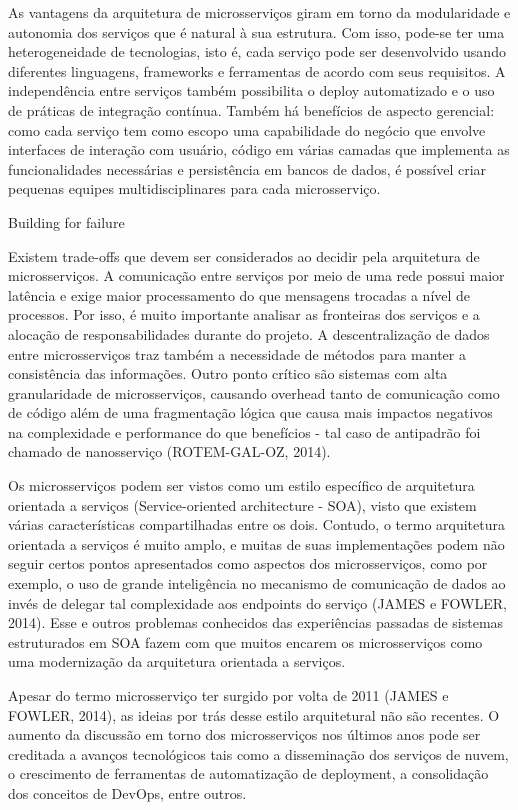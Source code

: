 As vantagens da arquitetura de microsserviços giram em torno da modularidade e autonomia dos serviços que é natural à sua estrutura. Com isso, pode-se ter uma heterogeneidade de tecnologias, isto é, cada serviço pode ser desenvolvido usando diferentes linguagens, frameworks e ferramentas de acordo com seus requisitos. A independência entre serviços também possibilita o deploy automatizado e o uso de práticas de integração contínua. Também há benefícios de aspecto gerencial: como cada serviço tem como escopo uma capabilidade do negócio que envolve interfaces de interação com usuário, código em várias camadas que implementa as funcionalidades necessárias e persistência em bancos de dados, é possível criar pequenas equipes multidisciplinares para cada microsserviço.

Building for failure %

Existem trade-offs que devem ser considerados ao decidir pela arquitetura de microsserviços. A comunicação entre serviços por meio de uma rede possui maior latência e exige maior processamento do que mensagens trocadas a nível de processos. Por isso, é muito importante analisar as fronteiras dos serviços e a alocação de responsabilidades durante do projeto. A descentralização de dados entre microsserviços traz também a necessidade de métodos para manter a consistência das informações. Outro ponto crítico são sistemas com alta granularidade de microsserviços, causando overhead tanto de comunicação como de código além de uma fragmentação lógica que causa mais impactos negativos na complexidade e performance do que benefícios - tal caso de antipadrão foi chamado de nanosserviço (ROTEM-GAL-OZ, 2014).

Os microsserviços podem ser vistos como um estilo específico de arquitetura orientada a serviços (Service-oriented architecture - SOA), visto que existem várias características compartilhadas entre os dois. Contudo, o termo arquitetura orientada a serviços é muito amplo, e muitas de suas implementações podem não seguir certos pontos apresentados como aspectos dos microsserviços, como por exemplo, o uso de grande inteligência no mecanismo de comunicação de dados ao invés de delegar tal complexidade aos endpoints do serviço (JAMES e FOWLER, 2014). Esse e outros problemas conhecidos das experiências passadas de sistemas estruturados em SOA fazem com que muitos encarem os microsserviços como uma modernização da arquitetura orientada a serviços.

Apesar do termo microsserviço ter surgido por volta de 2011 (JAMES e FOWLER, 2014), as ideias por trás desse estilo arquitetural não são recentes. O aumento da discussão em torno dos microsserviços nos últimos anos pode ser creditada a avanços tecnológicos tais como a disseminação dos serviços de nuvem, o crescimento de ferramentas de automatização de deployment, a consolidação dos conceitos de DevOps, entre outros.

